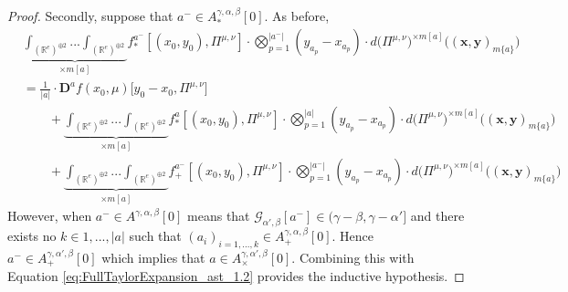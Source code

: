 \documentclass[a4paper,11pt,twoside]{article}
\numberwithin{equation}{section}
\theoremstyle{plain}
\newcommand{\bR}{\mathbb{R}}
\newcommand{\scG}{\mathscr{G}}
\newcommand{\rD}{\mathbf{D}}
\newcommand{\1}{\mathbbm{1}}
\begin{document}
\begin{proof}
		Secondly, suppose that $a^- \in A_{\ast}^{\gamma, \alpha, \beta}[0]$. As before, 
		\begin{align}
			\nonumber
			&\underbrace{ \int_{(\bR^e)^{\oplus 2}} ... \int_{(\bR^e)^{\oplus 2}} }_{\times m[a]} f_{\ast}^{a^-}[ (x_0, y_0), \Pi^{\mu, \nu}] 
			\cdot 
			\bigotimes_{p=1}^{|a^-|} ( y_{a_p} - x_{a_p}) \cdot d\big( \Pi^{\mu, \nu}\big)^{\times m[a]} \Big( (\boldsymbol{x}, \boldsymbol{y})_{m\{a\} }\Big)
			\\
			\nonumber
			&= \frac{1}{|a|} \cdot \rD^a f(x_0, \mu)\big[ y_0- x_0, \Pi^{\mu, \nu} \big] 
			\\
			\nonumber
			&\qquad + \underbrace{ \int_{(\bR^e)^{\oplus 2}} ... \int_{(\bR^e)^{\oplus 2}} }_{\times m[a]} f_{\ast}^{a}[ (x_0, y_0), \Pi^{\mu, \nu}] 
			\cdot 
			\bigotimes_{p=1}^{|a|} ( y_{a_p} - x_{a_p}) \cdot d\big( \Pi^{\mu, \nu}\big)^{\times m[a]} \Big( (\boldsymbol{x}, \boldsymbol{y})_{m\{a\}}\Big)
			\\
			\label{eq:FullTaylorExpansion_ast_1.2}
			&\qquad + \underbrace{ \int_{(\bR^e)^{\oplus 2}} ... \int_{(\bR^e)^{\oplus 2}} }_{\times m[a]} f_{+}^{a^-}[ (x_0, y_0), \Pi^{\mu, \nu}] 
			\cdot 
			\bigotimes_{p=1}^{|a^-|} ( y_{a_p} - x_{a_p}) \cdot d\big( \Pi^{\mu, \nu}\big)^{\times m[a]} \Big( (\boldsymbol{x}, \boldsymbol{y})_{m\{a\}}\Big)
		\end{align}
		However, when $a^- \in A^{\gamma, \alpha, \beta}[0]$ means that $\scG_{\alpha', \beta}[a^-]\in (\gamma-\beta, \gamma-\alpha']$ and there exists no $k\in 1, ..., |a|$ such that $(a_i)_{i=1, ..., k} \in A_{+}^{\gamma, \alpha, \beta}[0]$. Hence $a^- \in A_{+}^{\gamma, \alpha', \beta}[0]$ which implies that $a\in A_{\times}^{\gamma, \alpha', \beta}[0]$. Combining this with Equation \eqref{eq:FullTaylorExpansion_ast_1.2} provides the inductive hypothesis. 
		

\end{proof}
\end{document}
